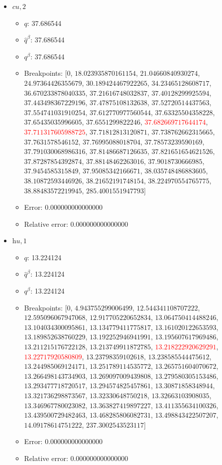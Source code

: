 \documentclass{article}%
\begin{document}
\begin{itemize}
\begin{itemize}
		\item Error: 0.000000000000000%
		\item Relative error: 0.000000000000000%
	\end{itemize}%
	\item $\textit{cu},2$%
	\begin{itemize}%
		\item $q$: 37.686544%
		\item $\hat{q}^\beta$: 37.686544%
		\item $q^\beta$: 37.686544%
		\item Breakpoints: $[$$0$, $18.023935870161154$, $21.04660840930274$, $24.97364426355679$, $30.189424467922265$, $34.23465128608717$, $36.670233878040335$, $37.21616748032837$, $37.40128299925594$, $37.443498367229196$, $37.47875108132638$, $37.52720514437563$, $37.554741031910254$, $37.612770977560544$, $37.63325504358228$, $37.65435035996605$, $37.6551299822246$, \textcolor{red}{$37.682669717644174$}, \textcolor{red}{$37.711317605988725$}, $37.71812813120871$, $37.738762662315665$, $37.7631578546152$, $37.76995088018704$, $37.78573239590169$, $37.791030068986316$, $37.81486687126635$, $37.821651654621526$, $37.87287854392874$, $37.88148462263016$, $37.9018730666985$, $37.9454585315849$, $37.95085342166671$, $38.035748486883605$, $38.10872593446926$, $38.21652191748154$, $38.224970554765775$, $38.88483572219945$, $285.4001551947793$$]$%
		\item Error: 0.000000000000000%
		\item Relative error: 0.000000000000000%
	\end{itemize}%
	\item $\textit{hu},1$%
	\begin{itemize}%
		\item $q$: 13.224124%
		\item $\hat{q}^\beta$: 13.224124%
		\item $q^\beta$: 13.224124%
		\item Breakpoints: $[$$0$, $4.943755299006499$, $12.544341108707222$, $12.595096067947068$, $12.917705220652834$, $13.064750414488246$, $13.104034300095861$, $13.134779411775817$, $13.161020122653593$, $13.189852638760229$, $13.192252946941991$, $13.195607617969486$, $13.211215176722128$, $13.213749911872785$, \textcolor{red}{$13.218222920629291$}, \textcolor{red}{$13.22717920580809$}, $13.23798359102618$, $13.238585544475612$, $13.244985069124171$, $13.251789114535772$, $13.265751604070672$, $13.266498143734903$, $13.269097009439808$, $13.279580305153486$, $13.293477718720517$, $13.294574825457861$, $13.30871858348944$, $13.321736298873567$, $13.32330648750218$, $13.32663103908035$, $13.346967780023082$, $13.363827419897227$, $13.411355634100326$, $13.439500729482463$, $13.468285806082731$, $13.498843422507207$, $14.09178614751222$, $237.3002543523117$$]$%
		\item Error: 0.000000000000000%
		\item Relative error: 0.000000000000000%
	\end{itemize}%
\end{itemize}%
\end{document}
